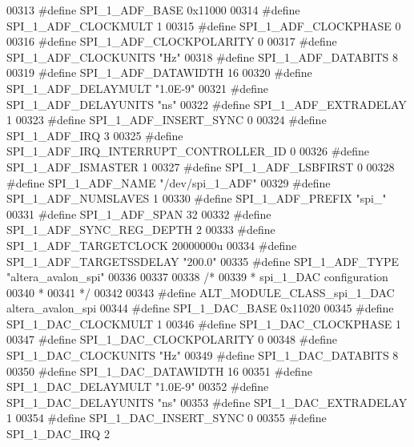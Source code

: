 \begin{DoxyCode}
00313 \textcolor{preprocessor}{#define SPI\_1\_ADF\_BASE 0x11000}
00314 \textcolor{preprocessor}{#define SPI\_1\_ADF\_CLOCKMULT 1}
00315 \textcolor{preprocessor}{#define SPI\_1\_ADF\_CLOCKPHASE 0}
00316 \textcolor{preprocessor}{#define SPI\_1\_ADF\_CLOCKPOLARITY 0}
00317 \textcolor{preprocessor}{#define SPI\_1\_ADF\_CLOCKUNITS "Hz"}
00318 \textcolor{preprocessor}{#define SPI\_1\_ADF\_DATABITS 8}
00319 \textcolor{preprocessor}{#define SPI\_1\_ADF\_DATAWIDTH 16}
00320 \textcolor{preprocessor}{#define SPI\_1\_ADF\_DELAYMULT "1.0E-9"}
00321 \textcolor{preprocessor}{#define SPI\_1\_ADF\_DELAYUNITS "ns"}
00322 \textcolor{preprocessor}{#define SPI\_1\_ADF\_EXTRADELAY 1}
00323 \textcolor{preprocessor}{#define SPI\_1\_ADF\_INSERT\_SYNC 0}
00324 \textcolor{preprocessor}{#define SPI\_1\_ADF\_IRQ 3}
00325 \textcolor{preprocessor}{#define SPI\_1\_ADF\_IRQ\_INTERRUPT\_CONTROLLER\_ID 0}
00326 \textcolor{preprocessor}{#define SPI\_1\_ADF\_ISMASTER 1}
00327 \textcolor{preprocessor}{#define SPI\_1\_ADF\_LSBFIRST 0}
00328 \textcolor{preprocessor}{#define SPI\_1\_ADF\_NAME "/dev/spi\_1\_ADF"}
00329 \textcolor{preprocessor}{#define SPI\_1\_ADF\_NUMSLAVES 1}
00330 \textcolor{preprocessor}{#define SPI\_1\_ADF\_PREFIX "spi\_"}
00331 \textcolor{preprocessor}{#define SPI\_1\_ADF\_SPAN 32}
00332 \textcolor{preprocessor}{#define SPI\_1\_ADF\_SYNC\_REG\_DEPTH 2}
00333 \textcolor{preprocessor}{#define SPI\_1\_ADF\_TARGETCLOCK 20000000u}
00334 \textcolor{preprocessor}{#define SPI\_1\_ADF\_TARGETSSDELAY "200.0"}
00335 \textcolor{preprocessor}{#define SPI\_1\_ADF\_TYPE "altera\_avalon\_spi"}
00336 
00337 
00338 \textcolor{comment}{/*}
00339 \textcolor{comment}{ * spi\_1\_DAC configuration}
00340 \textcolor{comment}{ *}
00341 \textcolor{comment}{ */}
00342 
00343 \textcolor{preprocessor}{#define ALT\_MODULE\_CLASS\_spi\_1\_DAC altera\_avalon\_spi}
00344 \textcolor{preprocessor}{#define SPI\_1\_DAC\_BASE 0x11020}
00345 \textcolor{preprocessor}{#define SPI\_1\_DAC\_CLOCKMULT 1}
00346 \textcolor{preprocessor}{#define SPI\_1\_DAC\_CLOCKPHASE 1}
00347 \textcolor{preprocessor}{#define SPI\_1\_DAC\_CLOCKPOLARITY 0}
00348 \textcolor{preprocessor}{#define SPI\_1\_DAC\_CLOCKUNITS "Hz"}
00349 \textcolor{preprocessor}{#define SPI\_1\_DAC\_DATABITS 8}
00350 \textcolor{preprocessor}{#define SPI\_1\_DAC\_DATAWIDTH 16}
00351 \textcolor{preprocessor}{#define SPI\_1\_DAC\_DELAYMULT "1.0E-9"}
00352 \textcolor{preprocessor}{#define SPI\_1\_DAC\_DELAYUNITS "ns"}
00353 \textcolor{preprocessor}{#define SPI\_1\_DAC\_EXTRADELAY 1}
00354 \textcolor{preprocessor}{#define SPI\_1\_DAC\_INSERT\_SYNC 0}
00355 \textcolor{preprocessor}{#define SPI\_1\_DAC\_IRQ 2}

\end{DoxyCode}
